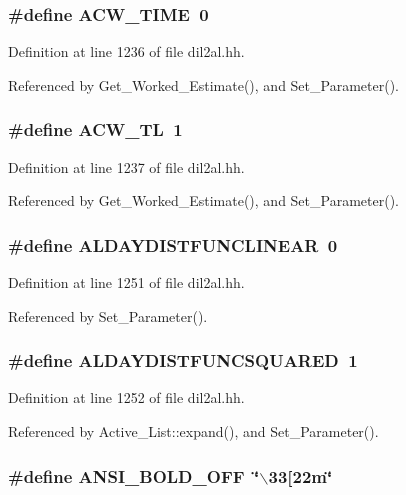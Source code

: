 \subsubsection{\setlength{\rightskip}{0pt plus 5cm}\#define ACW\_\-TIME\ 0}\label{dil2al_8hh_a85}




Definition at line 1236 of file dil2al.hh.

Referenced by Get\_\-Worked\_\-Estimate(), and Set\_\-Parameter().
\subsubsection{\setlength{\rightskip}{0pt plus 5cm}\#define ACW\_\-TL\ 1}\label{dil2al_8hh_a86}




Definition at line 1237 of file dil2al.hh.

Referenced by Get\_\-Worked\_\-Estimate(), and Set\_\-Parameter().
\subsubsection{\setlength{\rightskip}{0pt plus 5cm}\#define ALDAYDISTFUNCLINEAR\ 0}\label{dil2al_8hh_a96}




Definition at line 1251 of file dil2al.hh.

Referenced by Set\_\-Parameter().
\subsubsection{\setlength{\rightskip}{0pt plus 5cm}\#define ALDAYDISTFUNCSQUARED\ 1}\label{dil2al_8hh_a97}




Definition at line 1252 of file dil2al.hh.

Referenced by Active\_\-List::expand(), and Set\_\-Parameter().
\subsubsection{\setlength{\rightskip}{0pt plus 5cm}\#define ANSI\_\-BOLD\_\-OFF\ \char`\"{}$\backslash$33[22m\char`\"{}}\label{dil2al_8hh_a92}




